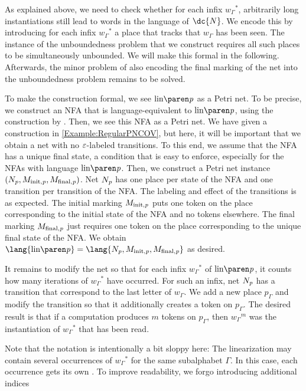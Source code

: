 \documentclass[../../diss.tex]{subfiles}
\begin{document}
As explained above, we need to check whether for each infix ${w_\Gamma}^*$, arbitrarily long instantiations still lead to words in the language of $\dc{N}$.
We encode this by introducing for each infix ${w_\Gamma}^*$ a place that tracks that $w_\Gamma$ has been seen.
The instance of the unboundedness problem that we construct requires all such places to be simultaneously unbounded.
We will make this formal in the following.
Afterwards, the minor problem of also encoding the final marking of the net into the unboundedness problem remains to be solved.

To make the construction formal, we see $\linof{\product}$ as a Petri net.
To be precise, we construct an NFA that is language-equivalent to $\linof{\product}$, \eg using the construction by .
Then, we see this NFA as a Petri net.
We have given a construction in \cref{Example:RegularPNCOV}, but here, it will be important that we obtain a net with no $\varepsilon$-labeled transitions.
To this end, we assume that the NFA has a unique final state, a condition that is easy to enforce, especially for the NFAs with language $\linof{\product}$.
Then, we construct a Petri net instance $(N_{\mathit{p}},M_{{\text{init}},\mathit{p}},M_{{\text{final}},\mathit{p}})$.
Net $N_{\mathit{p}}$ has one place per state of the NFA and one transition per transition of the NFA.\@
The labeling and effect of the transitions is as expected.
The initial marking $M_{{\text{init}},\mathit{p}}$ puts one token on the place corresponding to the initial state of the NFA and no tokens elsewhere.
The final marking $M_{{\text{final}},\mathit{p}}$ just requires one token on the place corresponding to the unique final state of the NFA.
We obtain $\lang{\linof{\product}} = \lang{N_\product,M_{\init,\product},M_{\final,\product}}$ as desired.

It remains to modify the net so that for each infix ${w_\Gamma}^*$ of $\linof{\product}$, it counts how many iterations of ${w_\Gamma}^*$ have occurred.
For such an infix, net $N_{\mathit{p}}$ has a transition that correspond to the last letter of $w_\Gamma$.
We add a new place $p_\Gamma$ and modify the transition so that it additionally creates a token on $p_\Gamma$.
The desired result is that if a computation produces $m$ tokens on $p_\Gamma$, then ${w_\Gamma}^m$ was the instantiation of ${w_\Gamma}^*$ that has been read.

Note that the notation is intentionally a bit sloppy here:
The linearization may contain several occurrences of ${w_\Gamma}^*$ for the same subalphabet $\Gamma$.
In this case, each occurrence gets its own .
To improve readability, we forgo introducing additional indices
\end{document}
